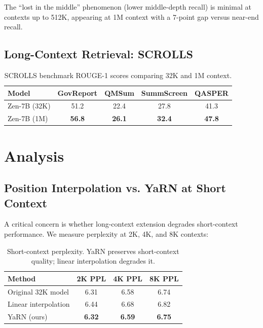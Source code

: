 \documentclass[11pt,a4paper]{article}
\begin{document}
The ``lost in the middle'' phenomenon (lower middle-depth recall) is minimal at contexts
up to 512K, appearing at 1M context with a 7-point gap versus near-end recall.

\subsection{Long-Context Retrieval: SCROLLS}

\begin{table}[H]
\centering
\begin{tabular}{lcccc}
\toprule
\textbf{Model} & \textbf{GovReport} & \textbf{QMSum} & \textbf{SummScreen} & \textbf{QASPER} \\
\midrule
Zen-7B (32K) & 51.2 & 22.4 & 27.8 & 41.3 \\
Zen-7B (1M) & \textbf{56.8} & \textbf{26.1} & \textbf{32.4} & \textbf{47.8} \\
\bottomrule
\end{tabular}
\caption{SCROLLS benchmark ROUGE-1 scores comparing 32K and 1M context.}
\end{table}

\section{Analysis}

\subsection{Position Interpolation vs. YaRN at Short Context}

A critical concern is whether long-context extension degrades short-context performance.
We measure perplexity at 2K, 4K, and 8K contexts:

\begin{table}[H]
\centering
\begin{tabular}{lccc}
\toprule
\textbf{Method} & \textbf{2K PPL} & \textbf{4K PPL} & \textbf{8K PPL} \\
\midrule
Original 32K model & 6.31 & 6.58 & 6.74 \\
Linear interpolation & 6.44 & 6.68 & 6.82 \\
YaRN (ours) & \textbf{6.32} & \textbf{6.59} & \textbf{6.75} \\
\bottomrule
\end{tabular}
\caption{Short-context perplexity. YaRN preserves short-context quality; linear interpolation degrades it.}
\end{table}
\end{document}
